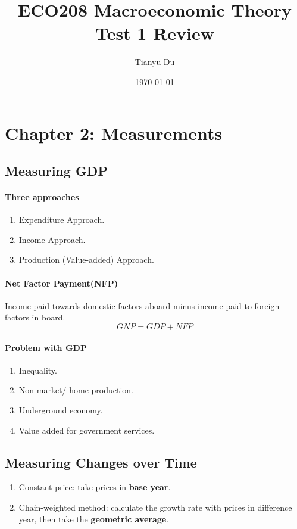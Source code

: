 \documentclass[11pt]{article}
\title{ECO208 Macroeconomic Theory \\ Test 1 Review}
\author{Tianyu Du}
\date{\today}
\begin{document}
\maketitle
\doclicenseThis
\tableofcontents

\section{Chapter 2: Measurements}
\subsection{Measuring GDP}
\paragraph{Three approaches}
\begin{enumerate}
	\item Expenditure Approach.
	\item Income Approach.
	\item Production (Value-added) Approach.
\end{enumerate}
\paragraph{Net Factor Payment(NFP)} Income paid towards domestic factors aboard minus income paid to foreign factors in board.
\[
	GNP = GDP + NFP
\]
\paragraph{Problem with GDP}
\begin{enumerate}
	\item Inequality.
	\item Non-market/ home production.
	\item Underground economy.
	\item Value added for government services. 
\end{enumerate}

\subsection{Measuring Changes over Time}
\begin{enumerate}
	\item Constant price: take prices in \textbf{base year}.
	\item Chain-weighted method: calculate the growth rate with prices in difference year, then take the \textbf{geometric average}.
\end{enumerate}
\end{document}
